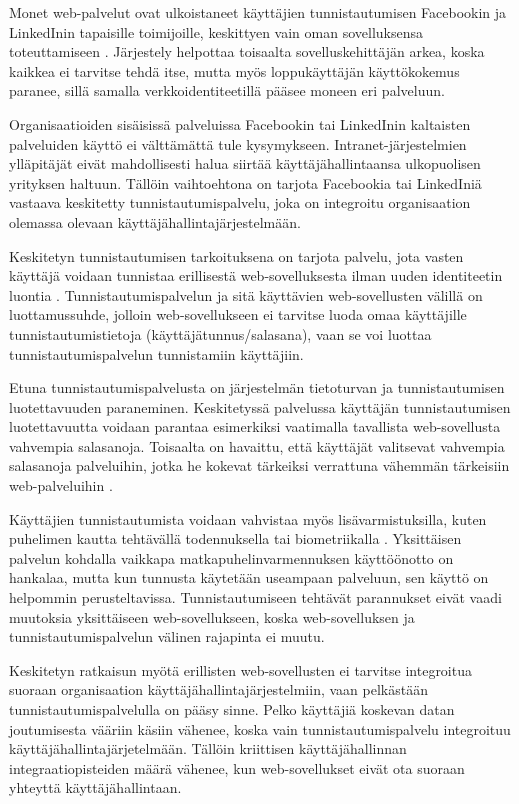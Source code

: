 Monet web-palvelut ovat ulkoistaneet käyttäjien tunnistautumisen Facebookin ja LinkedInin tapaisille toimijoille, keskittyen vain oman sovelluksensa toteuttamiseen \cite{facebook}. Järjestely helpottaa toisaalta sovelluskehittäjän arkea, koska kaikkea ei tarvitse tehdä itse, mutta myös loppukäyttäjän käyttökokemus paranee, sillä samalla verkkoidentiteetillä pääsee moneen eri palveluun.

Organisaatioiden sisäisissä palveluissa Facebookin tai LinkedInin kaltaisten palveluiden käyttö ei välttämättä tule kysymykseen. Intranet-järjestelmien ylläpitäjät eivät mahdollisesti halua siirtää käyttäjähallintaansa ulkopuolisen yrityksen haltuun. Tällöin vaihtoehtona on tarjota Facebookia tai LinkedIniä vastaava keskitetty tunnistautumispalvelu, joka on integroitu organisaation olemassa olevaan käyttäjähallintajärjestelmään.

Keskitetyn tunnistautumisen tarkoituksena on tarjota palvelu, jota vasten käyttäjä voidaan tunnistaa erillisestä web-sovelluksesta ilman uuden identiteetin luontia \cite{facebook}. Tunnistautumispalvelun ja sitä käyttävien web-sovellusten välillä on luottamussuhde, jolloin web-sovellukseen ei tarvitse luoda omaa käyttäjille tunnistautumistietoja (käyttäjätunnus/salasana), vaan se voi luottaa tunnistautumispalvelun tunnistamiin käyttäjiin.

Etuna tunnistautumispalvelusta on järjestelmän tietoturvan ja tunnistautumisen luotettavuuden paraneminen. Keskitetyssä palvelussa käyttäjän tunnistautumisen luotettavuutta voidaan parantaa esimerkiksi vaatimalla tavallista web-sovellusta vahvempia salasanoja. Toisaalta on havaittu, että käyttäjät valitsevat vahvempia salasanoja palveluihin, jotka he kokevat tärkeiksi verrattuna vähemmän tärkeisiin web-palveluihin \cite{password_habits}.

Käyttäjien tunnistautumista voidaan vahvistaa myös lisävarmistuksilla, kuten puhelimen kautta tehtävällä todennuksella tai biometriikalla \cite{nisti}. Yksittäisen palvelun kohdalla vaikkapa matkapuhelinvarmennuksen käyttöönotto on hankalaa, mutta kun tunnusta käytetään useampaan palveluun, sen käyttö on helpommin perusteltavissa. Tunnistautumiseen tehtävät parannukset eivät vaadi muutoksia yksittäiseen web-sovellukseen, koska web-sovelluksen ja tunnistautumispalvelun välinen rajapinta ei muutu.

Keskitetyn ratkaisun myötä erillisten web-sovellusten ei tarvitse integroitua suoraan organisaation käyttäjähallintajärjestelmiin, vaan pelkästään tunnistautumispalvelulla on pääsy sinne. Pelko käyttäjiä koskevan datan joutumisesta vääriin käsiin vähenee, koska vain tunnistautumispalvelu integroituu käyttäjähallintajärjetelmään. Tällöin kriittisen käyttäjähallinnan integraatiopisteiden määrä vähenee, kun web-sovellukset eivät ota suoraan yhteyttä käyttäjähallintaan.

